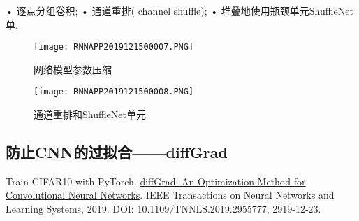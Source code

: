 • 逐点分组卷积;
• 通道重排( channel shuffle);
• 堆叠地使用瓶颈单元ShuffleNet单.
\begin{figure}[H]
\centering
\texttt{[image: RNNAPP2019121500007.PNG]}
\caption{网络模型参数压缩}
\label{RNNAPP2019121500007}\vspace{-0.4cm}
\end{figure}
\begin{figure}[H]
\centering
\texttt{[image: RNNAPP2019121500008.PNG]}
\caption{通道重排和ShuffleNet单元}
\label{RNNAPP2019121500008}\vspace{-0.4cm}
\end{figure}
\subsection{防止CNN的过拟合——diffGrad}
Train CIFAR10 with PyTorch. \href{https://ieeexplore.ieee.org/document/8939562}{diffGrad: An Optimization Method for Convolutional Neural Networks}. IEEE Transactions on Neural Networks and Learning Systems, 2019.
DOI: 10.1109/TNNLS.2019.2955777, 2919-12-23.


